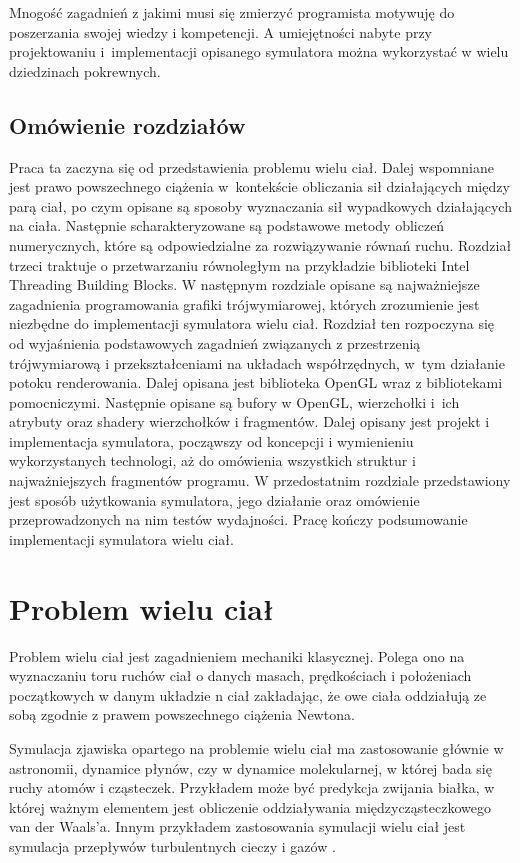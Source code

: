 \documentclass[12pt, twoside, openany]{report}
\begin{document}
Mnogość zagadnień z jakimi musi się zmierzyć programista motywuję do poszerzania swojej wiedzy i kompetencji. A umiejętności nabyte przy projektowaniu i~implementacji opisanego symulatora można wykorzystać w wielu dziedzinach pokrewnych.

\section{Omówienie rozdziałów}

Praca ta zaczyna się od przedstawienia problemu wielu ciał. Dalej wspomniane jest prawo powszechnego ciążenia w~kontekście obliczania sił działających między parą ciał, po czym opisane są sposoby wyznaczania sił wypadkowych działających na ciała. Następnie scharakteryzowane są podstawowe metody obliczeń numerycznych, które są odpowiedzialne za rozwiązywanie równań ruchu. Rozdział trzeci traktuje o przetwarzaniu równoległym na przykładzie biblioteki Intel Threading Building Blocks. W następnym rozdziale opisane są najważniejsze zagadnienia programowania grafiki trójwymiarowej, których zrozumienie jest niezbędne do implementacji symulatora wielu ciał. Rozdział ten rozpoczyna się od wyjaśnienia podstawowych zagadnień związanych z przestrzenią trójwymiarową i przekształceniami na układach współrzędnych, w~tym działanie potoku renderowania. Dalej opisana jest biblioteka OpenGL wraz z bibliotekami pomocniczymi. Następnie opisane są bufory w OpenGL, wierzchołki i~ich atrybuty oraz shadery wierzchołków i fragmentów. Dalej opisany jest projekt i implementacja symulatora, począwszy od koncepcji i wymienieniu wykorzystanych technologi, aż do omówienia wszystkich struktur i najważniejszych fragmentów programu. W przedostatnim rozdziale przedstawiony jest sposób użytkowania symulatora, jego działanie oraz omówienie przeprowadzonych na nim testów wydajności. Pracę kończy podsumowanie implementacji symulatora wielu ciał.

\chapter{Problem wielu ciał}

Problem wielu ciał jest zagadnieniem mechaniki klasycznej. Polega ono na wyznaczaniu toru ruchów ciał o danych masach, prędkościach i położeniach początkowych w danym układzie n ciał zakładając, że owe ciała oddziałują ze sobą zgodnie z prawem powszechnego ciążenia Newtona.

Symulacja zjawiska opartego na problemie wielu ciał ma zastosowanie głównie w astronomii, dynamice płynów, czy w dynamice molekularnej, w której bada się ruchy atomów i cząsteczek. Przykładem może być predykcja zwijania białka, w której ważnym elementem jest obliczenie oddziaływania międzycząsteczkowego van der Waals’a. Innym przykładem zastosowania symulacji wielu ciał jest symulacja przepływów turbulentnych cieczy i gazów \cite{bib:gpu_gems}.
\end{document}
